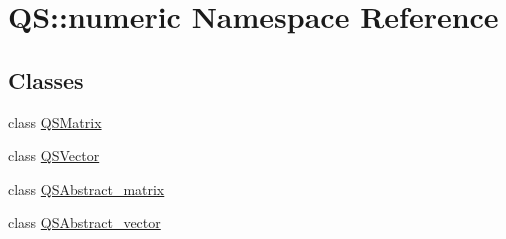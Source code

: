 \hypertarget{namespaceQS_1_1numeric}{\section{Q\-S\-:\-:numeric Namespace Reference}
\label{namespaceQS_1_1numeric}
}
\subsection*{Classes}
\begin{DoxyCompactItemize}
\item 
class \hyperlink{classQS_1_1numeric_1_1QSMatrix}{Q\-S\-Matrix}
\item 
class \hyperlink{classQS_1_1numeric_1_1QSVector}{Q\-S\-Vector}
\item 
class \hyperlink{classQS_1_1numeric_1_1QSAbstract__matrix}{Q\-S\-Abstract\-\_\-matrix}
\item 
class \hyperlink{classQS_1_1numeric_1_1QSAbstract__vector}{Q\-S\-Abstract\-\_\-vector}
\end{DoxyCompactItemize}
